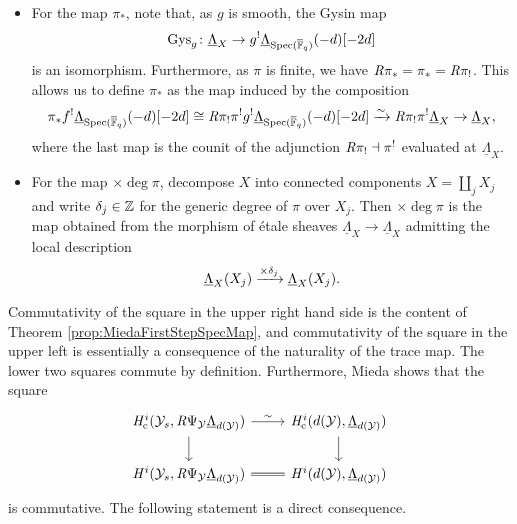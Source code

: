 \documentclass[../main.tex]{subfiles}
\begin{document}
\begin{itemize}
  \item For the map $\pi_*$, note that, as $g$ is smooth, the Gysin map 
    \begin{equation*}
    \mathrm{Gys}_g \colon \underline \Lambda_{X} \to g^! \underline
    \Lambda_{\operatorname{Spec}({\overline {\mathbb{F}}_q})}(-d)[-2d] 
    \end{equation*}
    is an isomorphism. 
    Furthermore, as $\pi$ is finite, we have $\mathit R \pi_* = \pi_* =
    \mathit R \pi_!$. This allows us to define $\pi_*$ as the map induced by the
    composition
    \begin{equation*}
      \pi_* f^! \underline \Lambda_{\operatorname{Spec}({\overline {\mathbb{F}}_q})}(-d)[-2d]
      \cong \mathit R\pi_! \pi^! g^! \underline \Lambda_{\operatorname{Spec}({\overline {\mathbb{F}}_q})}(-d)[-2d] 
      \xrightarrow{\sim} \mathit R \pi_! \pi^! \underline \Lambda_{X}
      \to \underline \Lambda_{X},
    \end{equation*}
    where the last map is the counit of the adjunction $\mathit R \pi_! \dashv \pi^!$
    evaluated at $\underline \Lambda_{X}$.
  \item For the map $\times \deg \pi$, decompose $X$ into connected components
    $X = \coprod_j X_j$ and write $\delta_j \in \mathbb{Z}$ for the generic degree of 
    $\pi$ over $X_j$. Then $\times \deg\pi$ is the map obtained from the morphism
    of \'etale sheaves $\underline \Lambda_X \to \underline \Lambda_X$ admitting
    the local description
    \begin{equation*}
      \underline \Lambda_{X}(X_j) \xrightarrow{\times \delta_j} \underline \Lambda_{X}(X_j).
    \end{equation*}
\end{itemize}
Commutativity of the square in the upper right hand side is the content of
Theorem \ref{prop:MiedaFirstStepSpecMap}, and commutativity of the square in the
upper left is essentially a consequence of the naturality of the trace map. The
lower two squares commute by definition. Furthermore, Mieda shows that the square
\begin{equation*}
\begin{tikzcd}[ampersand replacement=\&]
	{\hHc^i(\cY_s, \derR \Psi_\cY \underline \Lambda_{d(\cY)})} \& 
  {\hHc^i(d(\cY), \underline \Lambda_{d(\cY)})} \\
	{\hH^i(\cY_s, \derR \Psi_\cY \underline \Lambda_{d(\cY)})} \& 
  {\hH^i(d(\cY), \underline \Lambda_{d(\cY)})} 
	\arrow["\sim", from=1-1, to=1-2]
	\arrow[from=1-1, to=2-1]
	\arrow[from=1-2, to=2-2]
	\arrow[Rightarrow, no head, from=2-1, to=2-2]
\end{tikzcd}
\end{equation*}
is commutative. The following statement is a direct consequence.
\end{document}
